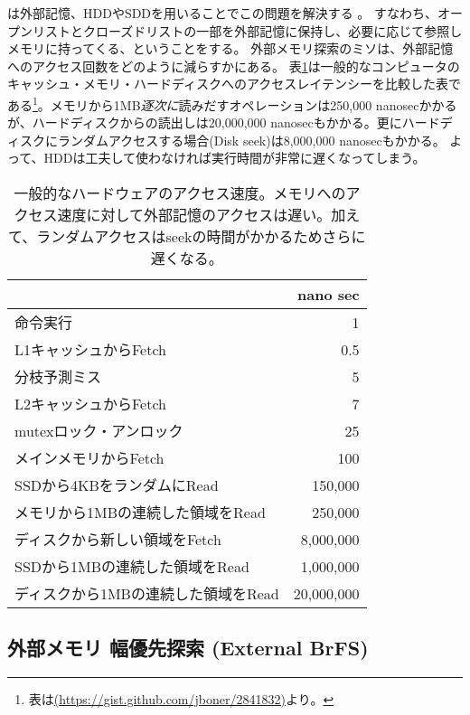 は外部記憶、HDDやSDDを用いることでこの問題を解決する \cite{chiang1995external}。
すなわち、オープンリストとクローズドリストの一部を外部記憶に保持し、必要に応じて参照しメモリに持ってくる、ということをする。
外部メモリ探索のミソは、外部記憶へのアクセス回数をどのように減らすかにある。
表\ref{tbl:latency}は一般的なコンピュータのキャッシュ・メモリ・ハードディスクへのアクセスレイテンシーを比較した表である\footnote{表は\url{(https://gist.github.com/jboner/2841832)}より。}。メモリから1MB{\it 逐次に}読みだすオペレーションは250,000 nanosecかかるが、ハードディスクからの読出しは20,000,000 nanosecもかかる。更にハードディスクにランダムアクセスする場合(Disk seek)は8,000,000 nanosecもかかる。
よって、HDDは工夫して使わなければ実行時間が非常に遅くなってしまう。%

\begin{table}
\centering
\caption{一般的なハードウェアのアクセス速度。メモリへのアクセス速度に対して外部記憶のアクセスは遅い。加えて、ランダムアクセスはseekの時間がかかるためさらに遅くなる。 }
\label{tbl:latency}
\begin{tabular}{|l|r|}
		   & nano sec \\ \hline
	命令実行 & 1 \\
	L1キャッシュからFetch & 0.5 \\
	分枝予測ミス 		& 5 \\
	L2キャッシュからFetch & 7 \\
	mutexロック・アンロック			& 25 \\
	メインメモリからFetch  	& 100 \\
	SSDから4KBをランダムにRead         & 150,000 \\
	メモリから1MBの連続した領域をRead & 250,000 \\
	ディスクから新しい領域をFetch & 8,000,000 \\
	SSDから1MBの連続した領域をRead		& 1,000,000 \\
	ディスクから1MBの連続した領域をRead 	& 20,000,000 \\
	
\end{tabular}
\end{table}

\subsection{外部メモリ 幅優先探索 (External BrFS)}
\label{sec:external-brfs}

